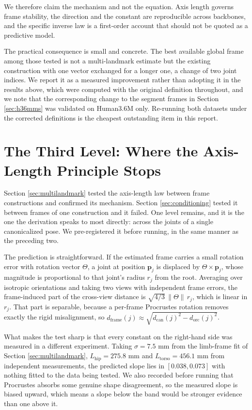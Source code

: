 \documentclass[12pt,a4paper]{report}
\begin{document}
We therefore claim the mechanism and not the equation. Axis length governs frame stability, the direction and the constant are reproducible across backbones, and the specific inverse law is a first-order account that should not be quoted as a predictive model.

The practical consequence is small and concrete. The best available global frame among those tested is not a multi-landmark estimate but the existing construction with one vector exchanged for a longer one, a change of two joint indices. We report it as a measured improvement rather than adopting it in the results above, which were computed with the original definition throughout, and we note that the corresponding change to the segment frames in Section \ref{sec:h36mms} was validated on Human3.6M only. Re-running both datasets under the corrected definitions is the cheapest outstanding item in this report.

\section{The Third Level: Where the Axis-Length Principle Stops}
\label{sec:radial}

Section \ref{sec:multilandmark} tested the axis-length law between frame constructions and confirmed its mechanism. Section \ref{sec:conditioning} tested it between frames of one construction and it failed. One level remains, and it is the one the derivation speaks to most directly: across the joints of a single canonicalized pose. We pre-registered it before running, in the same manner as the preceding two.

The prediction is straightforward. If the estimated frame carries a small rotation error with rotation vector $\Theta$, a joint at position $\mathbf{p}_j$ is displaced by $\Theta \times \mathbf{p}_j$, whose magnitude is proportional to that joint's radius $r_j$ from the root. Averaging over isotropic orientations and taking two views with independent frame errors, the frame-induced part of the cross-view distance is $\sqrt{4/3}\,\|\Theta\|\,r_j$, which is linear in $r_j$. That part is separable, because a per-frame Procrustes rotation removes exactly the rigid misalignment, so $d_{\text{frame}}(j) \approx \sqrt{d_{\text{can}}(j)^2 - d_{\text{orc}}(j)^2}$.

What makes the test sharp is that every constant on the right-hand side was measured in a different experiment. Taking $\sigma = 7.5$ mm from the limb-frame fit of Section \ref{sec:multilandmark}, $L_{\text{hip}} = 275.8$ mm and $L_{\text{torso}} = 456.1$ mm from independent measurements, the predicted slope lies in $[0.038, 0.073]$ with nothing fitted to the data being tested. We also recorded before running that Procrustes absorbs some genuine shape disagreement, so the measured slope is biased upward, which means a slope below the band would be stronger evidence than one above it.
\end{document}
